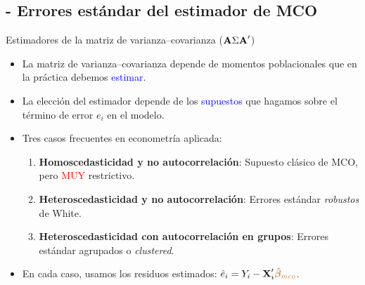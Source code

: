 \documentclass[10pt, xcolor=dvipsnames]{beamer}
\begin{document}
\subsection{- Errores estándar del estimador de MCO}

\begin{frame}{Estimadores de la matriz de varianza--covarianza ($\textbf{A} \Sigma \textbf{A}'$)}
\begin{itemize}
    \item La matriz de varianza--covarianza depende de momentos poblacionales que en la práctica debemos \textcolor{blue}{estimar}. \pause
    \vspace{1em}
    \item La elección del estimador depende de los \textcolor{blue}{supuestos} que hagamos sobre el término de error \(e_i\) en el modelo. \pause
    \vspace{1em}
    \item Tres casos frecuentes en econometría aplicada:
    \vspace{0.5em}
    \begin{enumerate}
        \item \textbf{Homoscedasticidad y no autocorrelación}: Supuesto clásico de MCO, pero \textcolor{red}{MUY} restrictivo. \pause
        \item \textbf{Heteroscedasticidad y no autocorrelación}: Errores estándar \textit{robustos} de White. \pause
        \item \textbf{Heteroscedasticidad con autocorrelación en grupos}:  Errores estándar agrupados o \emph{clustered}. \pause
    \end{enumerate}
    \vspace{0.5em}
    \item En cada caso, usamos los residuos estimados: \(\hat{e}_i = Y_i - \textbf{X}'_i \textcolor{brown}{\boldsymbol{\hat{\beta}}_{mco}}\).
 \end{itemize}
\end{frame}
\end{document}
